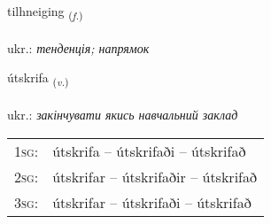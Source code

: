 \documentclass[frontgrid, backgrid]{flacards}\usepackage[]{graphicx}\usepackage[]{xcolor}
\begin{document}
\renewcommand{\flhead}{\vskip5pt \fboxsep=0pt {\small\bfseries\footnotesize Nafnorð | іменник}}
\renewcommand{\fcfoot}{\vskip5pt \fboxsep=0pt \hspace{2pt}{\small\bfseries\footnotesize 3K}}

\renewcommand{\blhead}{\vskip5pt {\small\bfseries\footnotesize Nafnorð | іменник }}
\renewcommand{\bcfoot}{\vskip5pt \hspace{2pt}{\small\bfseries\footnotesize 3K}}


{tilhneiging \small{\textsubscript{(\textit{f.})}} \\[1ex] %
 \\
ukr.: \emph{тенденція; напрямок} \\  [2ex]
\renewcommand*{\arraystretch}{0.8}
}

\renewcommand{\flhead}{\vskip5pt \fboxsep=0pt {\small\bfseries\footnotesize Sagnorð | дієслово}}
\renewcommand{\fcfoot}{\vskip5pt \fboxsep=0pt \hspace{2pt}{\small\bfseries\footnotesize 3K}}

\renewcommand{\blhead}{\vskip5pt {\small\bfseries\footnotesize Sagnorð | дієслово }}
\renewcommand{\bcfoot}{\vskip5pt \hspace{2pt}{\small\bfseries\footnotesize 3K}}


{útskrifa \small{\textsubscript{(\textit{v.})}} \\[1ex] %
\textphonetic{[utskrɪva]} \\
ukr.: \emph{закінчувати якись навчальний заклад} \\  [2ex]
\renewcommand*{\arraystretch}{0.8}
\begin{tabular}{p{1cm}l}
\textsc{1sg}: & útskrifa -- útskrifaði -- útskrifað \\ 
\textsc{2sg}: & útskrifar -- útskrifaðir -- útskrifað \\ 
\textsc{3sg}: & útskrifar -- útskrifaði -- útskrifað \\ 
\end{tabular}
}
\end{document}
